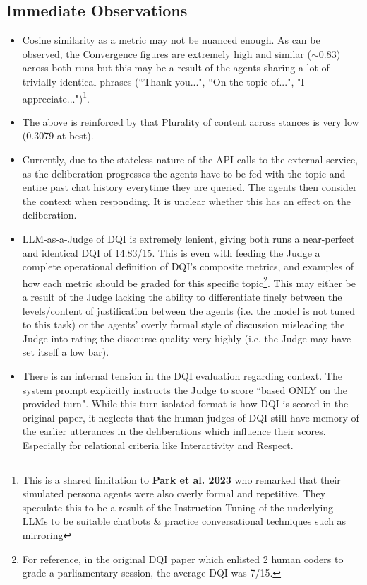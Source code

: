 \documentclass[titlepage]{article}
\begin{document}
\subsection{Immediate Observations}
\begin{itemize}
    \item Cosine similarity as a metric may not be nuanced enough. As can be observed, the Convergence figures are extremely high and similar ($\sim$0.83) across both runs but this may be a result of the agents sharing a lot of trivially identical phrases (``Thank you...", ``On the topic of...", "I appreciate...")\footnote{This is a shared limitation to \textbf{Park et al. 2023} who remarked that their simulated persona agents were also overly formal and repetitive. They speculate this to be a result of the Instruction Tuning of the underlying LLMs to be suitable chatbots \& practice conversational techniques such as mirroring}.
    \item The above is reinforced by that Plurality of content across stances is very low (0.3079 at best).
    \item Currently, due to the stateless nature of the API calls to the external service, as the deliberation progresses the agents have to be fed with the topic and entire past chat history everytime they are queried. The agents then consider the context when responding. It is unclear whether this has an effect on the deliberation.
    \item LLM-as-a-Judge of DQI is extremely lenient, giving both runs a near-perfect and identical DQI of 14.83/15. This is even with feeding the Judge a complete operational definition of DQI's composite metrics, and examples of how each metric should be graded for this specific topic\footnote{For reference, in the original DQI paper which enlisted 2 human coders to grade a parliamentary session, the average DQI was 7/15.}. This may either be a result of the Judge lacking the ability to differentiate finely between the levels/content of justification between the agents (i.e. the model is not tuned to this task) or the agents' overly formal style of discussion misleading the Judge into rating the discourse quality very highly (i.e. the Judge may have set itself a low bar).
    \item There is an internal tension in the DQI evaluation regarding context. The system prompt explicitly instructs the Judge to score ``based ONLY on the provided turn". While this turn-isolated format is how DQI is scored in the original paper, it neglects that the human judges of DQI still have memory of the earlier utterances in the deliberations which influence their scores.  Especially for relational criteria like Interactivity and Respect. 
\end{itemize}
\end{document}
